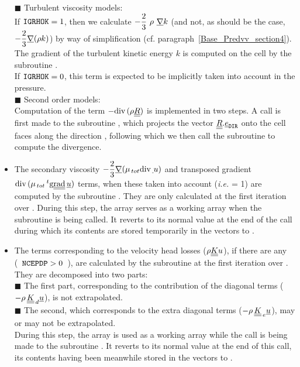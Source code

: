 \begin{itemize}
{\tiny$\blacksquare$} Turbulent viscosity models:\\
If $\text{\texttt{IGRHOK}}=1$, then we calculate $-\displaystyle \frac{2}{3}\ \rho\ \underline{\nabla} k$ (and not, as should be the case,
$-\displaystyle \frac{2}{3}\underline{\nabla} (\rho k)$) by way of simplification
(cf. paragraph~\ref{Base_Predvv_section4}). The gradient of the turbulent kinetic energy $k$ is computed on the cell by the subroutine . \\
If $\text{\texttt{IGRHOK}}=0$, this term is expected to be implicitly taken into account in the pressure.\\
{\tiny$\blacksquare$} Second order models:\\
Computation of the term $-\text{div}\,(\rho \underline{\underline{R}})$ is implemented in two steps. A call is first made to the subroutine , which projects the vector $\underline{\underline{R}}.\underline{e}_{\text{\texttt{DIR}}}$ onto the cell faces along the direction , following which we then call the subroutine  to compute the divergence.\\
\linebreak
\item The secondary viscosity $- \displaystyle \frac {2} {3}\underline{\nabla} (\mu_{\,tot} \text{div}\, \underline{\,}{u})$ and transposed gradient $ \text{div}\, (\mu_{\,tot} \,^t\text{g}\underline{\underline{{\text{rad}}}}\, \underline{u})$ terms, when these taken into account (\emph{i.e.}  = 1) are computed by the subroutine . They are only calculated at the first iteration over . During this step, the array  serves as a working array when the subroutine   is being called. It reverts to its normal value at the end of the call during which its contents are stored temporarily in the vectors  to .
\\
\item The terms corresponding to the velocity head losses ($\rho \underline{\underline{K}}
{u}$), if there are any (\ $\text{\texttt{NCEPDP}}> 0$\ ), are calculated by the subroutine  at the first iteration over . They are decomposed into two parts:\\
{\tiny$\blacksquare$} The first part, corresponding to the contribution of the diagonal terms ($-\rho\,\underline{\underline{K}}_{\,d}\underline{u}$), is not extrapolated.\\
{\tiny$\blacksquare$} The second, which corresponds to the extra diagonal terms
($-\rho\,\underline{\underline{K}}_{\,e}\underline{u}$), may or may not be extrapolated.\\
During this step, the array  is used as a working array while the call is being made to the subroutine . It reverts to its normal value at the end of this call, its contents having been meanwhile stored in the vectors  to .

\end{itemize}

